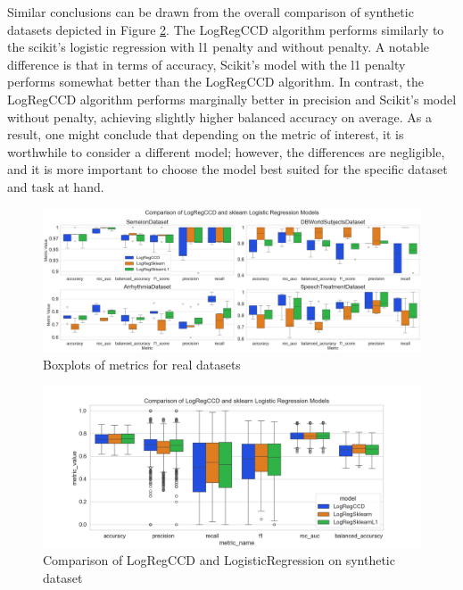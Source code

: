 \documentclass[11pt]{article}
\begin{document}
Similar conclusions can be drawn from the overall comparison of synthetic datasets depicted in Figure \ref{fig:comparison-synthetic-dataset}. The LogRegCCD algorithm performs similarly to the scikit's logistic regression with l1 penalty and without penalty. A notable difference is that in terms of accuracy, Scikit's model with the l1 penalty performs somewhat better than the LogRegCCD algorithm. In contrast, the LogRegCCD algorithm performs marginally better in precision and Scikit's model without penalty, achieving slightly higher balanced accuracy on average. As a result, one might conclude that depending on the metric of interest, it is worthwhile to consider a different model; however, the differences are negligible, and it is more important to choose the model best suited for the specific dataset and task at hand. \par


\begin{figure}[h]
    \centering
  \includegraphics[width=\textwidth]{../results/real_data_boxplots.png}
    \caption{Boxplots of metrics for real datasets}
    \label{fig:real-data-boxplots}
  \end{figure}

\begin{figure}[h]
    \centering
  \includegraphics[width=\textwidth]{../results/comparison-synthetic-dataset.png}
    \caption{Comparison of LogRegCCD and LogisticRegression on synthetic dataset}
    \label{fig:comparison-synthetic-dataset}
  \end{figure}
\end{document}
